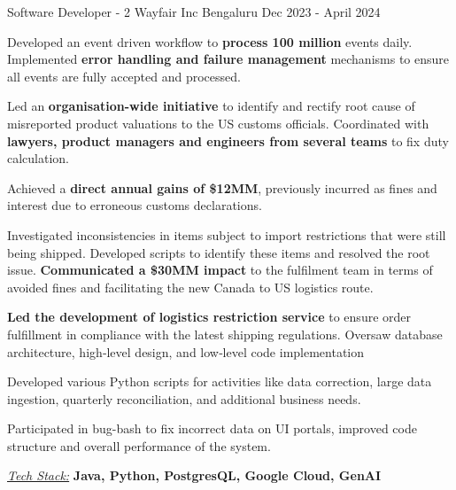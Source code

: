 \documentclass[11pt, a4paper]{awesome-cv} %
\begin{document}
\begin{cventries}
  \cventry
    {Software Developer - 2} %
    {Wayfair Inc} %
    {Bengaluru} %
    {Dec 2023 - April 2024} %
    {
      \begin{cvitems} %
        \item {Developed an event driven workflow to \textbf{process 100 million} events daily. Implemented \textbf{error handling and failure management} mechanisms to ensure all events are fully accepted and processed.}
        \item {Led an \textbf{organisation-wide initiative} to identify and rectify root cause of misreported product valuations to the US customs officials. Coordinated with \textbf{lawyers, product managers and engineers from several teams} to fix duty calculation.}
        \item Achieved a \textbf{direct annual gains of \$12MM}, previously incurred as fines and interest due to erroneous customs declarations.
        \item Investigated inconsistencies in items subject to import restrictions that were still being shipped. Developed scripts to identify these items and resolved the root issue.\textbf{ Communicated a \$30MM impact} to the fulfilment team in terms of avoided fines and facilitating the new Canada to US logistics route.
        \item \textbf{Led the development of logistics restriction service} to ensure order fulfillment in compliance with the latest shipping regulations. Oversaw database architecture, high‑level design, and low‑level code implementation
        \item {Developed various Python scripts for activities like data correction, large data ingestion, quarterly reconciliation, and additional business needs.}
        \item {Participated in bug-bash to fix incorrect data on UI portals, improved code structure and overall performance of the system.}
        \item {\textit{\href{}{\color{awesome-red} Tech Stack:}} \textbf{Java, Python, PostgresQL, Google Cloud, GenAI}}
      \end{cvitems}
    }




\end{cventries}
\end{document}
